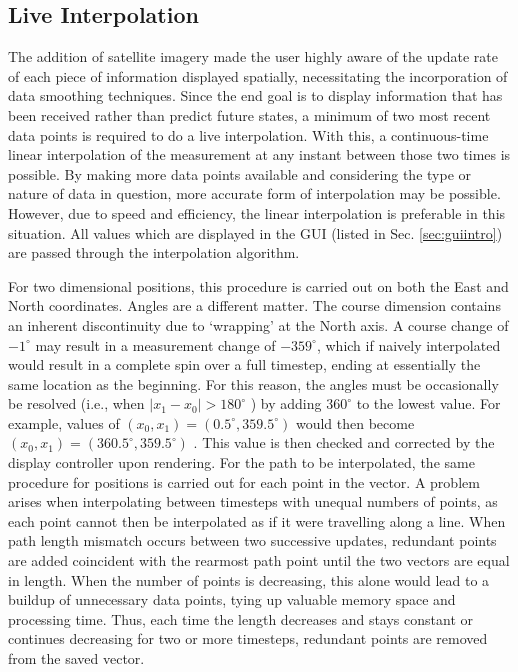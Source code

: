 \documentclass[twocolumn,10pt]{article}
\begin{document}
  \subsection*{Live Interpolation}

    The addition of satellite imagery made the user highly aware of the update rate of each piece of information displayed spatially, necessitating the incorporation of data smoothing techniques.  Since the end goal is to display information that has been received rather than predict future states, a minimum of two most recent data points is required to do a live interpolation.  With this, a continuous-time linear interpolation of the measurement at any instant between those two times is possible.  By making more data points available and considering the type or nature of data in question, more accurate form of interpolation may be possible. However, due to speed and efficiency, the linear interpolation is preferable in this situation.  All values which are displayed in the GUI (listed in Sec. \ref{sec:guiintro}) are passed through the interpolation algorithm.

    For two dimensional positions, this procedure is carried out on both the East and North coordinates. 
    Angles are a different matter. The course dimension contains an inherent discontinuity due to `wrapping' at the North axis. A course change of $-1^\circ$ may result in a measurement change of $-359^\circ$, which if naively interpolated would result in a complete spin over a full timestep, ending at essentially the same location as the beginning. For this reason, the angles must be occasionally be resolved (i.e., when $|x_1 - x_0| > 180^\circ$ ) by adding $360^\circ$ to the lowest value. For example, values of $(x_0, x_1) = (0.5^\circ, 359.5^\circ)$ would then become $(x_0, x_1) = (360.5^\circ, 359.5^\circ)$ .  This value is then checked and corrected by the display controller upon rendering.
    For the path to be interpolated,  the same procedure for positions is carried out for each point in the vector. A problem arises when interpolating between timesteps with unequal numbers of points, as each point cannot then be interpolated as if it were travelling along a line. When path length mismatch occurs between two successive updates, redundant points are added coincident with the rearmost path point until the two vectors are equal in length. When the number of points is decreasing, this alone would lead to a buildup of unnecessary data points, tying up valuable memory space and processing time. Thus, each time the length decreases and stays constant or continues decreasing for two or more timesteps, redundant points are removed from the saved vector.
\end{document}
